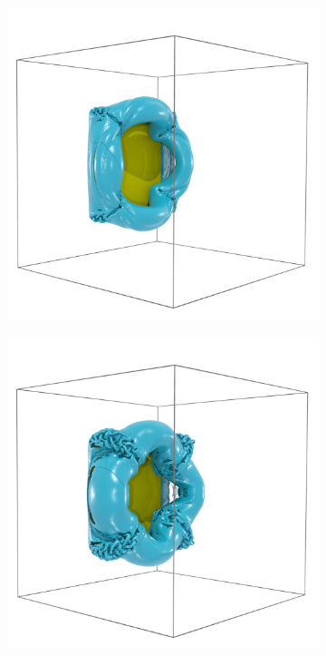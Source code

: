 \documentclass{article}
\begin{document}
\begin{figure}
\begin{subfigure}{.33\textwidth}
    \end{subfigure}%
    \begin{subfigure}{.33\textwidth}
        \centering
        \includegraphics[width=\textwidth]{tex/fig/disk_high_re_4.png}
    \end{subfigure}
    \begin{subfigure}{.33\textwidth}
        \centering
        \includegraphics[width=\textwidth]{tex/fig/disk_high_re_5.png}

\end{subfigure}
\end{figure}
\end{document}

